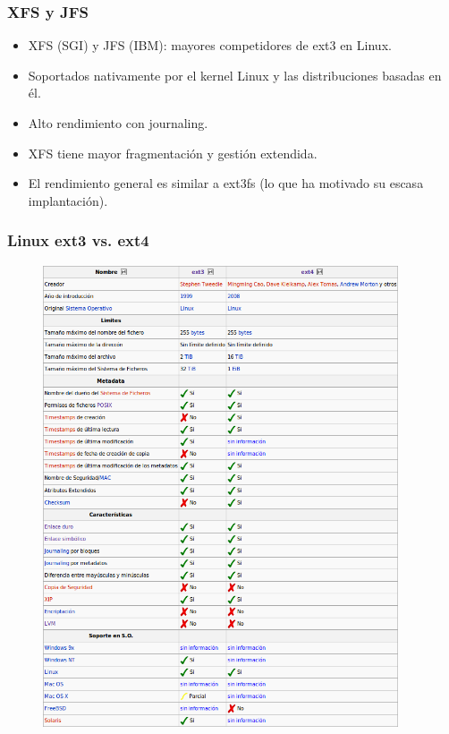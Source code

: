 \documentclass{beamer}
\begin{document}
\begin{frame}
  \frametitle{XFS y JFS}
  \begin{itemize}
    \item XFS (SGI) y JFS (IBM): mayores competidores de ext3 en Linux.
    \item Soportados nativamente por el kernel Linux y las distribuciones basadas en él.
    \item Alto rendimiento con journaling.
    \item XFS tiene mayor fragmentación y gestión extendida.
    \item El rendimiento general es similar a ext3fs (lo que ha motivado su escasa implantación).
  \end{itemize}
\end{frame}


\begin{frame}
  \frametitle{Linux ext3 vs. ext4}
\begin{figure}[h]
\begin{center}
  \includegraphics[width=10.5cm]{figs/Tabla_ext3_ext4.png}
\end{center}
\end{figure}
\end{frame}
\end{document}
